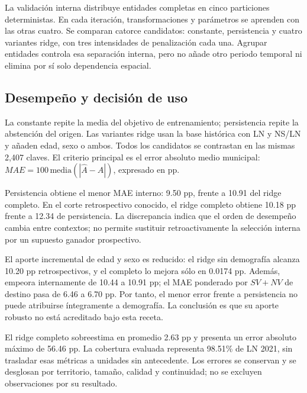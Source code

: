 \documentclass[12pt,a4paper]{article}
\newcommand{\primerparrafo}{\par\noindent\hspace*{1.1em}}
\newcommand{\iniciartabla}{\rowcolors{2}{NCSurfaceMuted}{white}}
\newcommand{\terminartabla}{\rowcolors{1}{}{}}
\begin{document}
La validación interna distribuye entidades completas en cinco particiones deterministas. En cada iteración, transformaciones y parámetros se aprenden con las otras cuatro. Se comparan catorce candidatos: constante, persistencia y cuatro variantes ridge, con tres intensidades de penalización cada una. Agrupar entidades controla esa separación interna, pero no añade otro periodo temporal ni elimina por sí solo dependencia espacial.

\clearpage
\subsection{Desempeño y decisión de uso}
\primerparrafo
La constante repite la media del objetivo de entrenamiento; persistencia repite la abstención del origen. Las variantes ridge usan la base histórica con LN y NS/LN y añaden edad, sexo o ambos. Todos los candidatos se contrastan en las mismas 2,407 claves. El criterio principal es el error absoluto medio municipal: $MAE=100\,\mathrm{media}(|\hat A-A|)$, expresado en pp.

\begin{table}[ht]
\centering
\iniciartabla
\caption{Comparación del error absoluto medio municipal.}
\label{tab:metricas}

\terminartabla
\end{table}

Persistencia obtiene el menor MAE interno: 9.50 pp, frente a 10.91 del ridge completo. En el corte retrospectivo conocido, el ridge completo obtiene 10.18 pp frente a 12.34 de persistencia. La discrepancia indica que el orden de desempeño cambia entre contextos; no permite sustituir retroactivamente la selección interna por un supuesto ganador prospectivo.

El aporte incremental de edad y sexo es reducido: el ridge sin demografía alcanza 10.20 pp retrospectivos, y el completo lo mejora sólo en 0.0174 pp. Además, empeora internamente de 10.44 a 10.91 pp; el MAE ponderado por $SV+NV$ de destino pasa de 6.46 a 6.70 pp. Por tanto, el menor error frente a persistencia no puede atribuirse íntegramente a demografía. La conclusión es que su aporte robusto no está acreditado bajo esta receta.

El ridge completo sobreestima en promedio 2.63 pp y presenta un error absoluto máximo de 56.46 pp. La cobertura evaluada representa 98.51\% de LN 2021, sin trasladar esas métricas a unidades sin antecedente. Los errores se conservan y se desglosan por territorio, tamaño, calidad y continuidad; no se excluyen observaciones por su resultado.
\end{document}
